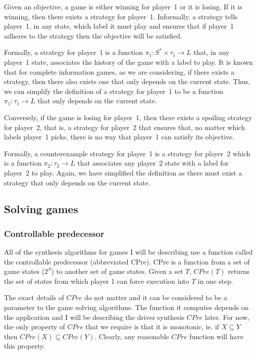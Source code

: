 
Given an objective, a game is either winning for player~1 or it is losing. If it is winning, then there exists a strategy for player~1. Informally, a strategy tells player~1, in any state, which label it must play and ensures that if player~1 adheres to the strategy then the objective will be satisfied.

Formally, a strategy for player~1 is a function $\pi_1 : S^* \times \tau_1 \rightarrow L$ that, in any player~1 state, associates the history of the game with a label to play. It is known that for complete information games, as we are considering, if there exists a strategy, then there also exists one that only depends on the current state. Thus, we can simplify the definition of a strategy for player~1 to be a function $\pi_1 : \tau_1 \rightarrow L$ that only depends on the current state.

Conversely, if the game is losing for player~1, then there exists a spoiling strategy for player~2, that is, a strategy for player~2 that ensures that, no matter which labels player~1 picks, there is no way that player~1 can satisfy its objective.

Formally, a counterexample strategy for player~1 is a strategy for player~2 which is a function $\pi_2 : \tau_2 \rightarrow L$ that associates any player~2 state with a label for player~2 to play. Again, we have simplified the definition as there must exist a strategy that only depends on the current state. 

\subsection{Solving games}
\subsubsection{Controllable predecessor}

All of the synthesis algorithms for games I will be describing use a function called the controllable predecessor (abbreviated CPre). CPre is a function from a set of game states ($2^S$) to another set of game states. Given a set $T$, $CPre(T)$ returns the set of states from which player 1 can force execution into $T$ in one step. 

The exact details of $CPre$ do not matter and it can be considered to be a parameter to the game solving algorithms. The function it computes depends on the application and I will be describing the driver synthesis $CPre$ later. For now, the only property of $CPre$ that we require is that it is monotonic, ie. if $X \subseteq Y$ then $CPre(X) \subseteq CPre(Y)$. Clearly, any reasonable $CPre$ function will have this property.

